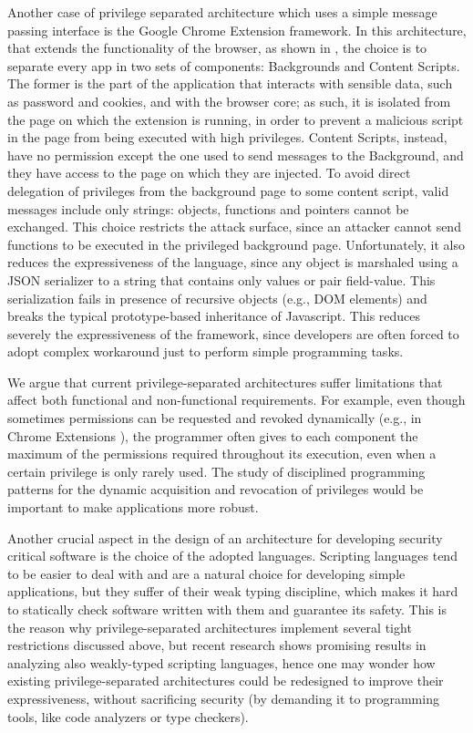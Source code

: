 \documentclass[10pt,a4paper]{article}
\begin{document}
Another case of privilege separated architecture which uses a simple message passing interface is the Google Chrome Extension framework. In this architecture, that extends the functionality of the browser, as shown in \cite{ChromeExtSpec,ChromeExtSpecSnd}, the choice is to separate every app in two sets of components: Backgrounds and Content Scripts. The former is the part of the application that interacts with sensible data, such as password and cookies, and with the browser core; as such, it is isolated from the page on which the extension is running, in order to prevent a malicious script in the page from being executed with high privileges. Content Scripts, instead, have no permission except the one used to send messages to the Background, and they have access to the page on which they are injected. To avoid direct delegation of privileges from the background page to some content script, valid messages include only strings: objects, functions and pointers cannot be exchanged. This choice restricts the attack surface, since an attacker cannot send functions to be executed in the privileged background page. Unfortunately, it also reduces the expressiveness of the language, since any object is marshaled using a JSON serializer to a string that contains only values or pair field-value. This serialization fails in presence of recursive objects (e.g., DOM elements) and breaks the typical prototype-based inheritance of Javascript. This reduces severely the expressiveness of the framework, since developers are often forced to adopt complex workaround just to perform simple programming tasks.

We argue that current privilege-separated architectures suffer limitations that affect both functional and non-functional requirements. For example, even though sometimes permissions can be requested and revoked dynamically (e.g., in Chrome Extensions \cite{ChromeExtensionOnline}), the programmer often gives to each component the maximum of the permissions required throughout its execution, even when a certain privilege is only rarely used. The study of disciplined programming patterns for the dynamic acquisition and revocation of privileges would be important to make applications more robust.

Another crucial aspect in the design of an architecture for developing security critical software is the choice of the adopted languages. Scripting languages tend to be easier to deal with and are a natural choice for developing simple applications, but they suffer of their weak typing discipline, which makes it hard to statically check software written with them and guarantee its safety. This is the reason why privilege-separated architectures implement several tight restrictions discussed above, but recent research\cite{LambdaJS,LambdaJSMightVanHorn,Strobe,TAJSDOM,TAJS} shows promising results in analyzing also weakly-typed scripting languages, hence one may wonder how existing privilege-separated architectures could be redesigned to improve their expressiveness, without sacrificing security (by demanding it to programming tools, like code analyzers or type checkers).
\end{document}
